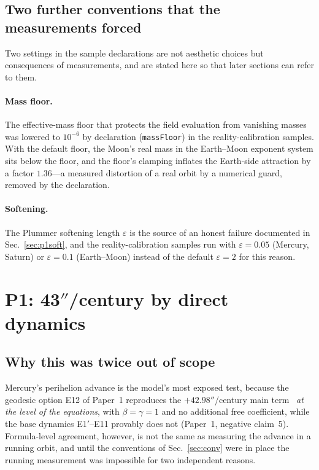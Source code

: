 \documentclass[aps,reprint,amsmath,amssymb,nofootinbib,superscriptaddress,floatfix]{revtex4-2}
\begin{document}
\subsection{Two further conventions that the measurements forced}
\label{sec:forced}

Two settings in the sample declarations are not aesthetic choices but
consequences of measurements, and are stated here so that later
sections can refer to them.

\paragraph*{Mass floor.}
The effective-mass floor that protects the field evaluation from
vanishing masses was lowered to $10^{-6}$ by declaration
(\texttt{massFloor}) in the reality-calibration samples.
With the default floor, the Moon's real mass in the Earth--Moon
exponent system sits below the floor, and the floor's clamping
inflates the Earth-side attraction by a factor $1.36$---a measured
distortion of a real orbit by a numerical guard, removed by the
declaration.

\paragraph*{Softening.}
The Plummer softening length $\varepsilon$ is the source of an honest
failure documented in Sec.~\ref{sec:p1soft}, and the
reality-calibration samples run with $\varepsilon=0.05$ (Mercury,
Saturn) or $\varepsilon=0.1$ (Earth--Moon) instead of the default
$\varepsilon=2$ for this reason.

\section{P1: \texorpdfstring{43$''$}{43 arcsec}/century by direct
  dynamics}
\label{sec:p1}

\subsection{Why this was twice out of scope}
\label{sec:p1history}

Mercury's perihelion advance is the model's most exposed test, because
the geodesic option E12 of Paper~1 reproduces the $+42.98''$/century
main term~\cite{Clemence1947,Park2017,Will2014} \emph{at the level of
the equations}, with $\beta=\gamma=1$
and no additional free coefficient, while the base dynamics
E1$'$--E11 provably does not (Paper~1, negative claim~5).
Formula-level agreement, however, is not the same as measuring the
advance in a running orbit, and until the conventions of
Sec.~\ref{sec:conv} were in place the running measurement was
impossible for two independent reasons.
\end{document}
